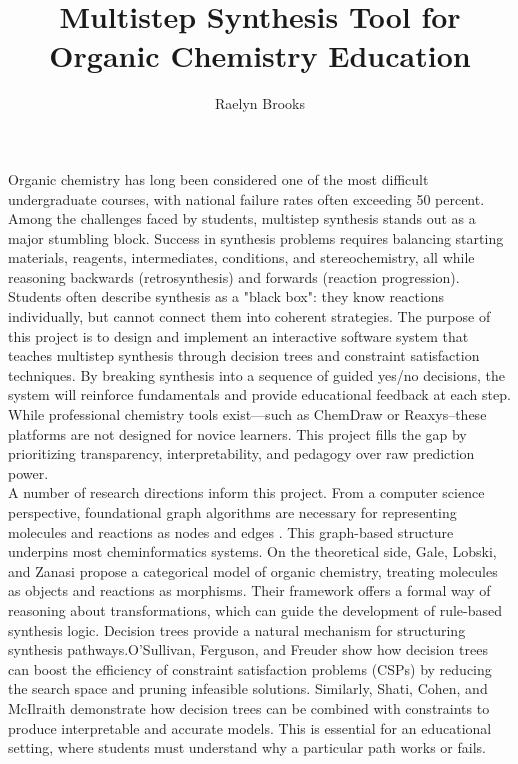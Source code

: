 \documentclass[12pt]{article}
\title{\textbf{Multistep Synthesis Tool for Organic Chemistry Education}}
\author{Raelyn Brooks}
\begin{document}
\maketitle
 
\indent 
Organic chemistry has long been considered one of the most difficult undergraduate courses, with national failure rates often exceeding 50 percent. 
Among the challenges faced by students, multistep synthesis stands out as a major stumbling block. Success in synthesis problems requires balancing starting materials, reagents, intermediates, conditions, and stereochemistry, all while reasoning backwards (retrosynthesis) and forwards (reaction progression). 
Students often describe synthesis as a "black box": they know reactions individually, but cannot connect them into coherent strategies.
The purpose of this project is to design and implement an interactive software system that teaches multistep synthesis through decision trees and constraint satisfaction techniques. By breaking synthesis into a sequence of guided yes/no decisions, the system will reinforce fundamentals and provide educational feedback at each step. 
While professional chemistry tools exist—such as ChemDraw or Reaxys--these platforms are not designed for novice learners. This project fills the gap by prioritizing transparency, interpretability, and pedagogy over raw prediction power.
\\
\indent 
A number of research directions inform this project. From a computer science perspective, foundational graph algorithms are necessary for representing molecules and reactions as nodes and edges \cite{clrsAlgorithms}. 
This graph-based structure underpins most cheminformatics systems. On the theoretical side, Gale, Lobski, and Zanasi \cite{10.1016/j.tcs.2025.115084} propose a categorical model of organic chemistry, treating molecules as objects and reactions as morphisms. 
Their framework offers a formal way of reasoning about transformations, which can guide the development of rule-based synthesis logic. Decision trees provide a natural mechanism for structuring synthesis pathways.O’Sullivan, Ferguson, and Freuder show how decision trees can boost the efficiency of constraint satisfaction problems (CSPs) by reducing the search space and pruning infeasible solutions. 
\cite{10.1109/ICTAI.2004.38} Similarly, Shati, Cohen, and McIlraith demonstrate how decision trees can be combined with constraints to produce interpretable and accurate models. This is essential for an educational setting, where students must understand why a particular path works or fails. \cite{10.24963/ijcai.2023/225}
\end{document}

